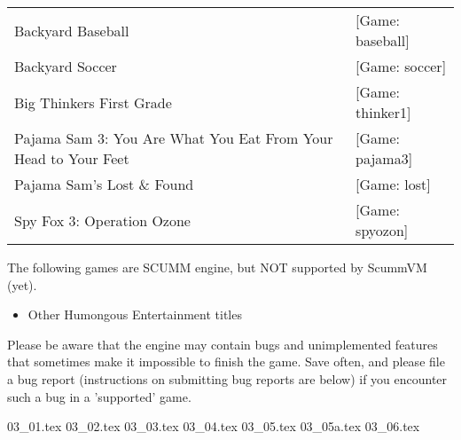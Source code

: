 \begin{itemize}
\begin{tabular}{ll}
  Backyard Baseball&                                             [Game: baseball]\\
  Backyard Soccer&                                               [Game: soccer]\\
  Big Thinkers First Grade&                                      [Game: thinker1]\\
  Pajama Sam 3: You Are What You Eat From Your Head to Your Feet&[Game: pajama3]\\
  Pajama Sam's Lost \& Found&                                    [Game: lost]\\
  Spy Fox 3: Operation Ozone&                                    [Game: spyozon]\\
\end{tabular}

  The following games are SCUMM engine, but NOT supported by ScummVM (yet).
  \begin{itemize}
  \item Other Humongous Entertainment titles
  \end{itemize}
%
Please be aware that the engine may contain bugs and unimplemented features
that sometimes make it impossible to finish the game. Save often, and please
file a bug report (instructions on submitting bug reports are below) if you
encounter such a bug in a 'supported' game.
\end{itemize}
 {03_01.tex}
 {03_02.tex}
 {03_03.tex}
 {03_04.tex}
 {03_05.tex}
 {03_05a.tex}
 {03_06.tex}
